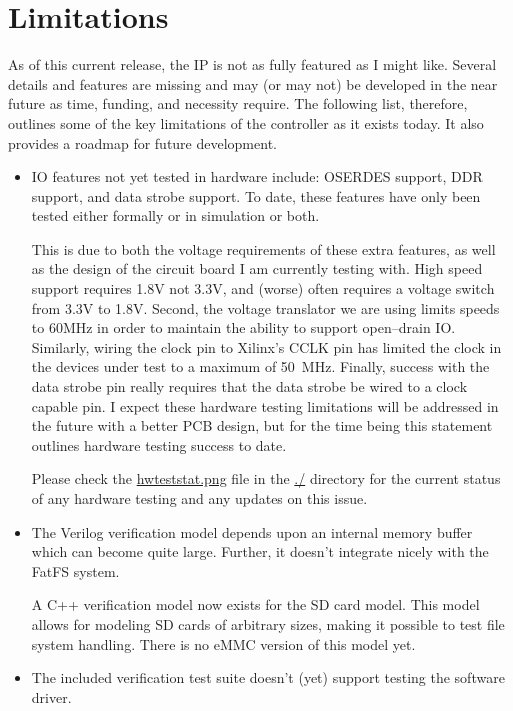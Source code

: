 \documentclass{gqtekspec}
\newcommand{\zhref}[2]{\href{#1}{\textcolor{dkblue}{#2}}}
\begin{document}
\section{Limitations}

As of this current release, the IP is not as fully featured as I might
like.  Several details and features are missing and may (or may not)
be developed in the near future as time, funding, and necessity require.
The following list, therefore, outlines some of the key limitations of the
controller as it exists today.  It also provides a roadmap for future
development.

\begin{itemize}
\item IO features not yet tested in hardware include: OSERDES support, DDR
	support, and data strobe support.  To date, these features have only
	been tested either formally or in simulation or both.

	This is due to both the voltage requirements of these extra features,
	as well as the design of the circuit board I am currently testing with.
	High speed support requires 1.8V not 3.3V, and (worse) often requires a
	voltage switch from 3.3V to 1.8V.  Second, the voltage translator we
	are using limits speeds to 60MHz in order to maintain the ability to
	support open--drain IO.  Similarly, wiring the clock pin to Xilinx's
	CCLK pin has limited the clock in the devices under test to a maximum
	of 50~MHz.  Finally, success with the data strobe pin really requires
	that the data strobe be wired to a clock capable pin.  I expect these
	hardware testing limitations will be addressed in the future with a
	better PCB design, but for the time being this statement outlines
	hardware testing success to date.

	Please check the \zhref{hwteststat.png}{hwteststat.png} file in
	the \zhref{doc/}{./} directory for the current status of any hardware
	testing and any updates on this issue.

\item The Verilog verification model depends upon an internal memory buffer
	which can become quite large.  Further, it doesn't integrate nicely
	with the FatFS system.

	A C++ verification model now exists for the SD card model.  This model
	allows for modeling SD cards of arbitrary sizes, making it possible
	to test file system handling.  There is no eMMC version of this model
	yet.

\item The included verification test suite doesn't (yet) support testing the
	software driver.


\end{itemize}
\end{document}
